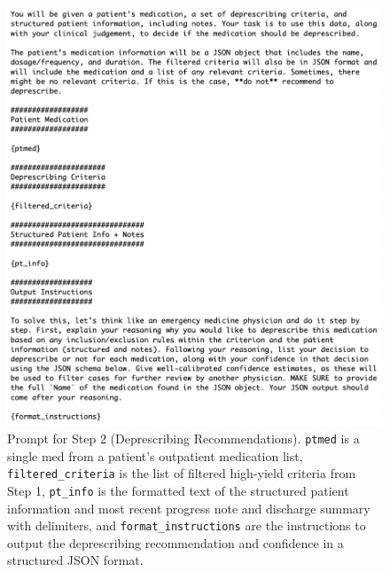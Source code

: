 \begin{figure}[ht!]
	\centering
	\includegraphics[width=\textwidth] {figures/aim1/step2_prompt.png}
	\caption{Prompt for Step 2 (Deprescribing Recommendations). \texttt{ptmed} is a single med from a patient’s outpatient medication list, \texttt{filtered\_criteria} is the list of filtered high-yield criteria from Step 1, \texttt{pt\_info} is the formatted text of the structured patient information and most recent progress note and discharge summary with delimiters, and \texttt{format\_instructions} are the instructions to output the deprescribing recommendation and confidence in a structured JSON format.} \label{fig:aim1-step2-prompt}
\end{figure}


